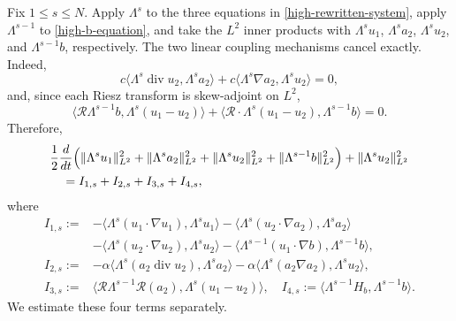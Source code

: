 \documentclass[10pt,reqno]{amsart}
\numberwithin{equation}{section}
\begin{document}
Fix $1\le s\le N$.  Apply $\Lambda^s$ to the three equations in
\eqref{high-rewritten-system}, apply $\Lambda^{s-1}$ to \eqref{high-b-equation}, and take
the $L^2$ inner products with $\Lambda^su_1$, $\Lambda^sa_2$,
$\Lambda^su_2$, and $\Lambda^{s-1}b$, respectively.  The two linear coupling
mechanisms cancel exactly.  Indeed,
\[%
c\langle \Lambda^s\operatorname{div}u_2,\Lambda^sa_2\rangle +c\langle \Lambda^s\nabla a_2,\Lambda^su_2\rangle=0,
\]%
and, since each Riesz transform is skew-adjoint on $L^2$,
\[%
 \langle \mathscr R\Lambda^{s-1}b,\Lambda^s(u_1-u_2)\rangle
+\langle \mathscr R\cdot\Lambda^s(u_1-u_2),\Lambda^{s-1}b\rangle=0.
\]%
Therefore,
\begin{align}\label{high-level-energy-identity}
&\frac12\frac{d}{dt}\Big(
\|\Lambda^su_1\|_{L^2}^2+\|\Lambda^sa_2\|_{L^2}^2
+\|\Lambda^su_2\|_{L^2}^2+\|\Lambda^{s-1}b\|_{L^2}^2\Big)
+\|\Lambda^su_2\|_{L^2}^2\notag\\
&\quad =I_{1,s}+I_{2,s}+I_{3,s}+I_{4,s},
\end{align}
where 
\begin{align*}
I_{1,s}:={}&-\big\langle\Lambda^s(u_1\cdot\nabla u_1),\Lambda^su_1\big\rangle
-\big\langle\Lambda^s(u_2\cdot\nabla a_2),\Lambda^sa_2\big\rangle\\
&-\big\langle\Lambda^s(u_2\cdot\nabla u_2),\Lambda^su_2\big\rangle
-\big\langle\Lambda^{s-1}(u_1\cdot\nabla b),\Lambda^{s-1}b\big\rangle,\\
I_{2,s}:={}&-\alpha\big\langle\Lambda^s(a_2\operatorname{div}u_2),\Lambda^sa_2\big\rangle
-\alpha\big\langle\Lambda^s(a_2\nabla a_2),\Lambda^su_2\big\rangle,\\
I_{3,s}:={}&\big\langle\mathscr R\Lambda^{s-1}\mathcal R(a_2),
\Lambda^s(u_1-u_2)\big\rangle,\quad I_{4,s}:=\big\langle\Lambda^{s-1}H_b,\Lambda^{s-1}b\big\rangle.
\end{align*}
We estimate these four terms separately.
\end{document}
